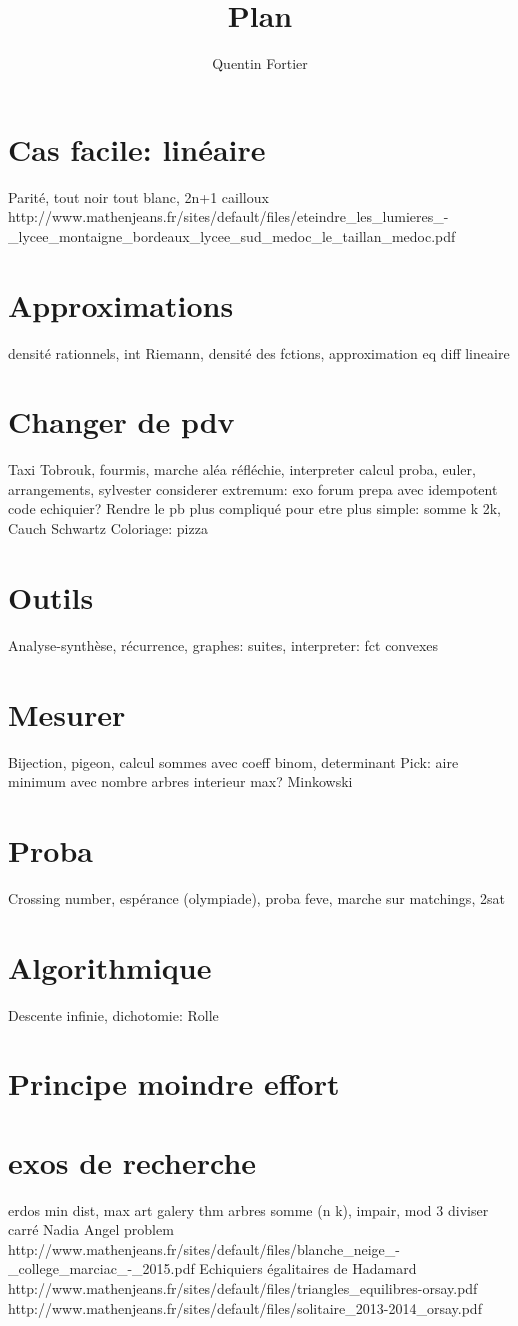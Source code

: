 \documentclass[10pt,a4paper,final]{article}
\author{Quentin Fortier}
\title{Plan}
\begin{document}
\section{Cas facile: linéaire}
Parité, tout noir tout blanc, 2n+1 cailloux
http://www.mathenjeans.fr/sites/default/files/eteindre_les_lumieres_-_lycee_montaigne_bordeaux_lycee_sud_medoc_le_taillan_medoc.pdf
\section{Approximations}
densité rationnels, int Riemann, densité des fctions, approximation eq diff lineaire
\section{Changer de pdv}
Taxi Tobrouk, fourmis, marche aléa réfléchie, interpreter calcul proba, euler, arrangements, sylvester
considerer extremum: exo forum prepa avec idempotent
code echiquier?
Rendre le pb plus compliqué pour etre plus simple: somme k 2k, Cauch Schwartz
Coloriage: pizza
\section{Outils}
Analyse-synthèse, récurrence, 
graphes: 
suites, interpreter: fct convexes
\section{Mesurer}
Bijection, pigeon, calcul sommes avec coeff binom, determinant
Pick: aire minimum avec nombre arbres interieur max? 
Minkowski
\section{Proba}
Crossing number, espérance (olympiade), proba feve, marche sur matchings, 2sat
\section{Algorithmique}
Descente infinie, dichotomie: Rolle
\section{Principe moindre effort}

\section{exos de recherche}
erdos min dist, max
art galery thm
arbres
somme (n k), impair, mod 3
diviser carré Nadia
Angel problem
http://www.mathenjeans.fr/sites/default/files/blanche_neige_-_college_marciac_-_2015.pdf
Echiquiers égalitaires de Hadamard
http://www.mathenjeans.fr/sites/default/files/triangles_equilibres-orsay.pdf
http://www.mathenjeans.fr/sites/default/files/solitaire_2013-2014_orsay.pdf
\end{document}
